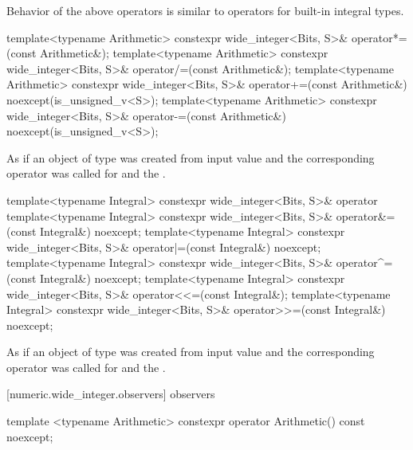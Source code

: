 \begin{itemdescr}
\effects Behavior of the above operators is similar to operators for built-in integral types.
\end{itemdescr}

\begin{itemdecl}
template<typename Arithmetic> 
  constexpr wide_integer<Bits, S>& operator*=(const Arithmetic&);
template<typename Arithmetic> 
  constexpr wide_integer<Bits, S>& operator/=(const Arithmetic&);
template<typename Arithmetic> 
  constexpr wide_integer<Bits, S>& operator+=(const Arithmetic&) noexcept(is_unsigned_v<S>);
template<typename Arithmetic> 
  constexpr wide_integer<Bits, S>& operator-=(const Arithmetic&) noexcept(is_unsigned_v<S>);
\end{itemdecl}

\begin{itemdescr}
\effects As if an object  of type  was created from input value and the corresponding operator was called for  and the .
\end{itemdescr}

\begin{itemdecl}
template<typename Integral> 
  constexpr wide_integer<Bits, S>& operator%
template<typename Integral> 
  constexpr wide_integer<Bits, S>& operator&=(const Integral&) noexcept;
template<typename Integral> 
  constexpr wide_integer<Bits, S>& operator|=(const Integral&) noexcept;
template<typename Integral> 
  constexpr wide_integer<Bits, S>& operator^=(const Integral&) noexcept;
template<typename Integral> 
  constexpr wide_integer<Bits, S>& operator<<=(const Integral&);
template<typename Integral> 
  constexpr wide_integer<Bits, S>& operator>>=(const Integral&) noexcept;
\end{itemdecl}

\begin{itemdescr}
\effects As if an object  of type  was created from input value and the corresponding operator was called for  and the .
\end{itemdescr}

[numeric.wide_integer.observers]{ observers}

\begin{itemdecl}
template <typename Arithmetic> constexpr operator Arithmetic() const noexcept;
\end{itemdecl}

